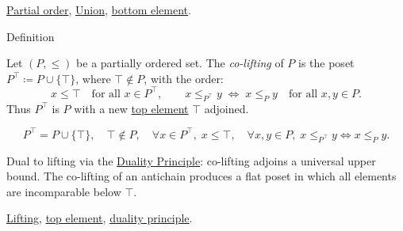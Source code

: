 \begin{dependencies}
\hyperref[def:lattice-order-partial-order]{Partial order},
\hyperref[def:union]{Union},
\hyperref[def:bottom-element]{bottom element}.
\end{dependencies}


\begin{definitionbox}{Definition}
\begin{definition}[Co-Lifting]
\label{def:co-lifting}
Let $(P, \leq)$ be a partially ordered set.  The \emph{co-lifting} of $P$
is the poset $P^{\top} \coloneqq P \cup \{\top\}$, where $\top \notin P$,
with the order:
\[
x \leq \top \quad \text{for all } x \in P^{\top},
\qquad
x \leq_{P^{\top}} y \;\Longleftrightarrow\; x \leq_P y
\quad \text{for all } x, y \in P.
\]
Thus $P^{\top}$ is $P$ with a new
\hyperref[def:top-element]{top element} $\top$ adjoined.
\end{definition}
\end{definitionbox}

\begin{remark*}
\[
P^{\top} = P \cup \{\top\},\quad
\top \notin P,\quad
\forall x \in P^{\top},\; x \leq \top,\quad
\forall x,y \in P,\; x \leq_{P^\top} y \Leftrightarrow x \leq_P y.
\]
\end{remark*}

\begin{remark*}[Interpretation]
Dual to lifting via the
\hyperref[prop:duality-principle]{Duality Principle}: co-lifting adjoins
a universal upper bound.  The co-lifting of an antichain produces a flat
poset in which all elements are incomparable below $\top$.
\end{remark*}

\begin{dependencies}
\hyperref[def:lifting]{Lifting},
\hyperref[def:top-element]{top element},
\hyperref[prop:duality-principle]{duality principle}.
\end{dependencies}
